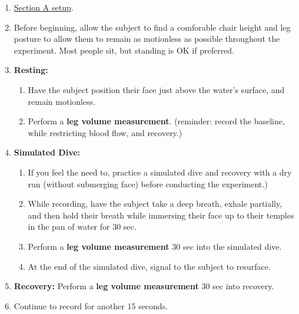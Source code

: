 \documentclass[
  letterpaper,
  DIV=11,
  numbers=noendperiod,
  oneside]{scrartcl}
\providecommand{\tightlist}{%
  \setlength{\itemsep}{0pt}\setlength{\parskip}{0pt}}\usepackage{longtable,booktabs,array}
\begin{document}
\begin{enumerate}
\def\labelenumi{\arabic{enumi}.}
\tightlist
\item
  \href{@sec-divesetup}{Section A setup}.
\item
  Before beginning, allow the subject to find a comforable chair height
  and leg posture to allow them to remain as motionless as possible
  throughout the experiment. Most people sit, but standing is OK if
  preferred.
\item
  \textbf{Resting:}

  \begin{enumerate}
  \def\labelenumii{\alph{enumii}.}
  \tightlist
  \item
    Have the subject position their face just above the water's surface,
    and remain motionless.
  \item
    Perform a \textbf{leg volume measurement}. (reminder: record the
    baseline, while restricting blood flow, and recovery.)
  \end{enumerate}
\item
  \textbf{Simulated Dive:}

  \begin{enumerate}
  \def\labelenumii{\alph{enumii}.}
  \tightlist
  \item
    If you feel the need to, practice a simulated dive and recovery with
    a dry run (without submerging face) before conducting the
    experiment.)
  \item
    While recording, have the subject take a deep breath, exhale
    partially, and then hold their breath while immersing their face up
    to their temples in the pan of water for 30 sec.~
  \item
    Perform a \textbf{leg volume measurement} 30 sec into the simulated
    dive.
  \item
    At the end of the simulated dive, signal to the subject to
    resurface.
  \end{enumerate}
\item
  \textbf{Recovery:} Perform a \textbf{leg volume measurement} 30 sec
  into recovery.\\
\item
  Continue to record for another 15 seconds.
\end{enumerate}
\end{document}
